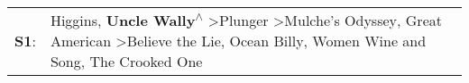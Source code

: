 \begin{supertabular}{p{0.03\textwidth}p{0.92\textwidth}}
 \textbf{S1}:  &  Higgins\textsuperscript{}, \enspace \textbf{Uncle Wally\textsuperscript{$\wedge$}} \textgreater \enspace Plunger\textsuperscript{} \textgreater \enspace Mulche's Odyssey\textsuperscript{}, \enspace Great American\textsuperscript{} \textgreater \enspace Believe the Lie\textsuperscript{}, \enspace Ocean Billy\textsuperscript{}, \enspace Women Wine and Song\textsuperscript{}, \enspace The Crooked One\textsuperscript{}  \enspace  \\
\end{supertabular}
